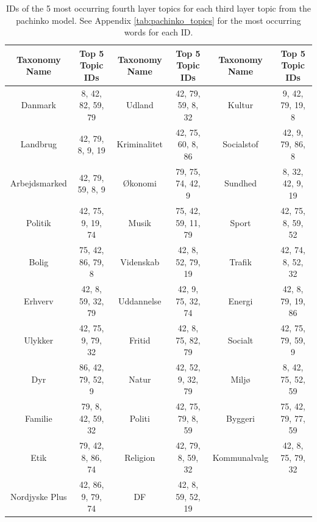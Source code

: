 \begin{table}[h]
	\centering
	\caption{IDs of the 5 most occurring fourth layer topics for each third layer topic from the pachinko model. See Appendix \autoref{tab:pachinko_topics} for the most occurring words for each ID.}
	\label{tab:pachinko_mid_topics}
	\begin{tabular}{c | c | c | c | c | c}
		Taxonomy Name & Top 5 Topic IDs & Taxonomy Name & Top 5 Topic IDs & Taxonomy Name & Top 5 Topic IDs \\ \hline
		Danmark & 8, 42, 82, 59, 79 & Udland & 42, 79, 59, 8, 32 & Kultur & 9, 42, 79, 19, 8 \\
		Landbrug & 42, 79, 8, 9, 19 & Kriminalitet & 42, 75, 60, 8, 86 & Socialstof & 42, 9, 79, 86, 8 \\
		Arbejdsmarked & 42, 79, 59, 8, 9 & Økonomi & 79, 75, 74, 42, 9 & Sundhed & 8, 32, 42, 9, 19 \\
		Politik & 42, 75, 9, 19, 74 & Musik & 75, 42, 59, 11, 79 & Sport & 42, 75, 8, 59, 52 \\
		Bolig & 75, 42, 86, 79, 8 & Videnskab & 42, 8, 52, 79, 19 & Trafik & 42, 74, 8, 52, 32 \\
		Erhverv & 42, 8, 59, 32, 79 & Uddannelse & 42, 9, 75, 32, 74 & Energi & 42, 8, 79, 19, 86 \\
		Ulykker & 42, 75, 9, 79, 32 & Fritid & 42, 8, 75, 82, 79 & Socialt & 42, 75, 79, 59, 9 \\
		Dyr & 86, 42, 79, 52, 9 & Natur & 42, 52, 9, 32, 79 & Miljø & 8, 42, 75, 52, 59 \\
		Familie & 79, 8, 42, 59, 32 & Politi & 42, 75, 79, 8, 59 & Byggeri & 75, 42, 79, 77, 59 \\
		Etik & 79, 42, 8, 86, 74 & Religion & 42, 79, 8, 59, 32 & Kommunalvalg & 42, 8, 75, 79, 32 \\
		Nordjyske Plus & 42, 86, 9, 79, 74 & DF & 42, 8, 59, 52, 19 & & \\
	\end{tabular}
\end{table}
